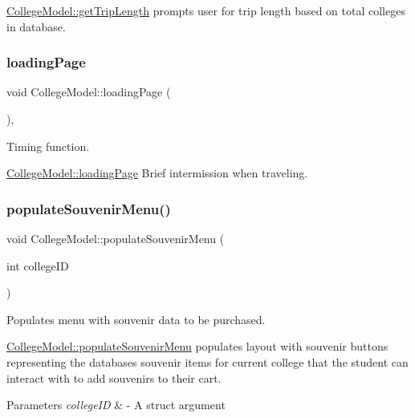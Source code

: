 \mbox{\hyperlink{class_college_model_ab621eb530418fdcbd35a88911881504f}{College\+Model\+::get\+Trip\+Length}} prompts user for trip length based on total colleges in database. \mbox{\label{class_college_model_ac37d99bb60d755ef0539d8e6c4481ab7}} 
\subsubsection{\texorpdfstring{loading\+Page}{loadingPage}}
{\footnotesize\ttfamily void College\+Model\+::loading\+Page (\begin{DoxyParamCaption}{ }\end{DoxyParamCaption})\hspace{0.3cm}{\ttfamily [protected]}, {\ttfamily [slot]}}



Timing function. 

\mbox{\hyperlink{class_college_model_ac37d99bb60d755ef0539d8e6c4481ab7}{College\+Model\+::loading\+Page}} Brief intermission when traveling. \mbox{\label{class_college_model_aeabb600577c25bbe804849baa4875c14}} 
\subsubsection{\texorpdfstring{populate\+Souvenir\+Menu()}{populateSouvenirMenu()}}
{\footnotesize\ttfamily void College\+Model\+::populate\+Souvenir\+Menu (\begin{DoxyParamCaption}\item[{int}]{college\+ID }\end{DoxyParamCaption})}



Populates menu with souvenir data to be purchased. 

\mbox{\hyperlink{class_college_model_aeabb600577c25bbe804849baa4875c14}{College\+Model\+::populate\+Souvenir\+Menu}} populates layout with souvenir buttons representing the databases souvenir items for current college that the student can interact with to add souvenirs to their cart.


\begin{DoxyParams}{Parameters}
{\em college\+ID} & -\/ A struct argument \\
\hline
\end{DoxyParams}
\mbox{\label{class_college_model_a95322085a90304da8cbb265c80a3c3aa}} 
